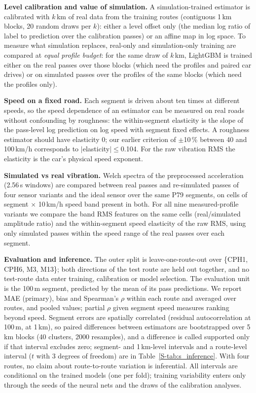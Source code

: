 \textbf{Level calibration and value of simulation.}
A simulation-trained estimator is calibrated with $k$\,km of real data from the training routes (contiguous 1\,km blocks, 20 random draws per $k$): either a level offset only (the median log ratio of label to prediction over the calibration passes) or an affine map in log space.
To measure what simulation replaces, real-only and simulation-only training are compared at \emph{equal profile budget}: for the same draw of $k$\,km, LightGBM is trained either on the real passes over those blocks (which need the profiles and paired car drives) or on simulated passes over the profiles of the same blocks (which need the profiles only).

\textbf{Speed on a fixed road.}
Each segment is driven about ten times at different speeds, so the speed dependence of an estimator can be measured on real roads without confounding by roughness: the within-segment elasticity is the slope of the pass-level log prediction on log speed with segment fixed effects.
A roughness estimator should have elasticity 0; our earlier criterion of $\pm$10\,\% between 40 and 100\,km/h corresponds to $|$elasticity$|\le$0.104.
For the raw vibration RMS the elasticity is the car's physical speed exponent.

\textbf{Simulated vs real vibration.}
Welch spectra of the preprocessed acceleration (2.56\,s windows) are compared between real passes and re-simulated passes of four sensor variants and the ideal sensor over the same P79 segments, on cells of segment $\times$ 10\,km/h speed band present in both.
For all nine measured-profile variants we compare the band RMS features on the same cells (real/simulated amplitude ratio) and the within-segment speed elasticity of the raw RMS, using only simulated passes within the speed range of the real passes over each segment.

\textbf{Evaluation and inference.}
The outer split is leave-one-route-out over \{CPH1, CPH6, M3, M13\}; both directions of the test route are held out together, and no test-route data enter training, calibration or model selection.
The evaluation unit is the 100\,m segment, predicted by the mean of its pass predictions.
We report MAE (primary), bias and Spearman's $\rho$ within each route and averaged over routes, and pooled values; partial $\rho$ given segment speed measures ranking beyond speed.
Segment errors are spatially correlated (residual autocorrelation \acfGbmHundred{} at 100\,m, \acfGbmKm{} at 1\,km), so paired differences between estimators are bootstrapped over 5\,km blocks (40 clusters, 2000 resamples), and a difference is called supported only if that interval excludes zero; segment- and 1\,km-level intervals and a route-level interval ($t$ with 3 degrees of freedom) are in Table~\ref{S-tab:s_inference}.
With four routes, no claim about route-to-route variation is inferential.
All intervals are conditional on the trained models (one per fold); training variability enters only through the seeds of the neural nets and the draws of the calibration analyses.

